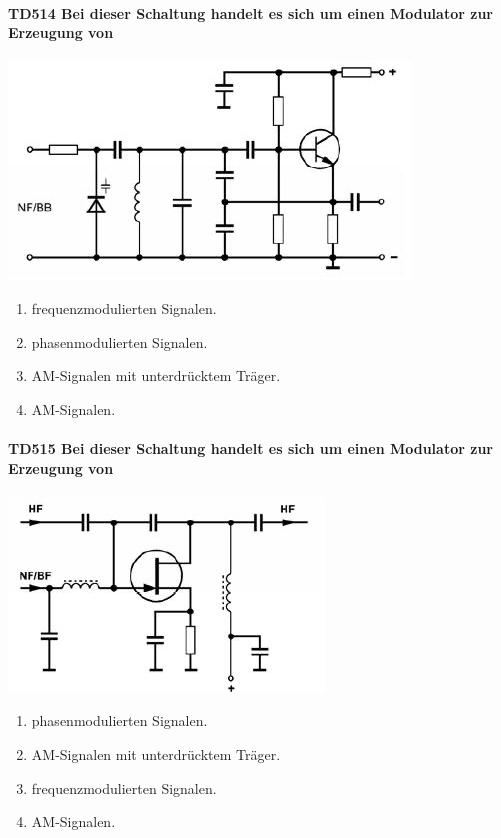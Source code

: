 \documentclass[8pt]{article}
\begin{document}
\begin{enumerate}
\begin{enumerate}[nolistsep,label=\Alph*]
\paragraph*{TD514 Bei dieser Schaltung handelt es sich um einen Modulator zur Erzeugung von} 
\begin{center}
	\begin{minipage}{\linewidth}
		\centering
		\includegraphics[scale=1.0]{pics/td514_a.jpg}
	\end{minipage}
\end{center}
\begin{enumerate}[nolistsep,label=\Alph*]
\item frequenzmodulierten Signalen. 
\item phasenmodulierten Signalen.
\item AM-Signalen mit unterdrücktem Träger.
\item AM-Signalen.
\end{enumerate}

\paragraph*{TD515 Bei dieser Schaltung handelt es sich um einen Modulator zur Erzeugung von}
\begin{center}
	\begin{minipage}{\linewidth}
		\centering
		\includegraphics[scale=1.0]{pics/td515_a.jpg}
	\end{minipage}
\end{center}
\begin{enumerate}[nolistsep,label=\Alph*]
\item phasenmodulierten Signalen.
\item AM-Signalen mit unterdrücktem Träger.
\item frequenzmodulierten Signalen.
\item AM-Signalen.
\end{enumerate}


\end{enumerate}
\end{enumerate}
\end{document}
